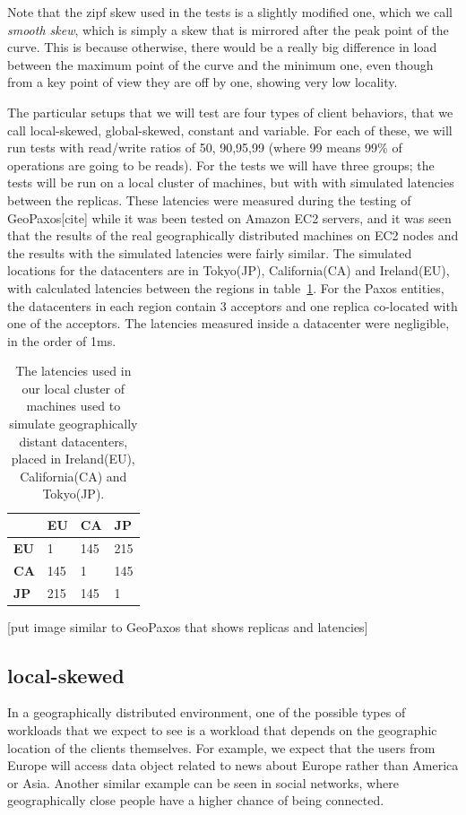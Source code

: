 Note that the zipf skew used in the tests is a slightly modified one, which we call \emph{smooth skew}, which is simply a skew that is mirrored after the peak point of the curve. This is because otherwise, there would be a really big difference in load between the maximum point of the curve and the minimum one, even though from a key point of view they are off by one, showing very low locality.

The particular setups that we will test are four types of client behaviors, that we call local-skewed, global-skewed, constant and variable. For each of these, we will run tests with read/write ratios of 50, 90,95,99 (where 99 means 99\% of operations are going to be reads). For the tests we will have three groups; the tests will be run on a local cluster of machines, but with with simulated latencies between the replicas. These latencies were measured during the testing of GeoPaxos[cite] while it was been tested on Amazon EC2 servers, and it was seen that the results of the real geographically distributed machines on EC2 nodes and the results with the simulated latencies were fairly similar. The simulated locations for the datacenters are in Tokyo(JP), California(CA) and Ireland(EU), with calculated latencies between the regions in table~\ref{tab:latencies}. For the Paxos entities, the datacenters in each region contain 3 acceptors and one replica co-located with one of the acceptors. The latencies measured inside a datacenter were negligible, in the order of 1ms.


\begin{table}[!htb]
  \centering
  \begin{tabular}{l l l l}
    \hline
    & \textbf{EU} & \textbf{CA} & \textbf{JP} \\
    \hline
    \textbf{EU} & 1 & 145 & 215 \\
    \textbf{CA} & 145 & 1 & 145 \\
    \textbf{JP} & 215 & 145 & 1 \\
    \hline
  \end{tabular}
  \caption{The latencies used in our local cluster of machines used to simulate geographically distant datacenters, placed in Ireland(EU), California(CA) and Tokyo(JP).}\label{tab:latencies}
\end{table}

[put image similar to GeoPaxos that shows replicas and latencies]

\clearpage
\subsection{local-skewed}\label{sec:local-skewed}
In a geographically distributed environment, one of the possible types of workloads that we expect to see is a workload that depends on the geographic location of the clients themselves. For example, we expect that the users from Europe will access data object related to news about Europe rather than America or Asia. Another similar example can be seen in social networks, where geographically close people have a higher chance of being connected.

